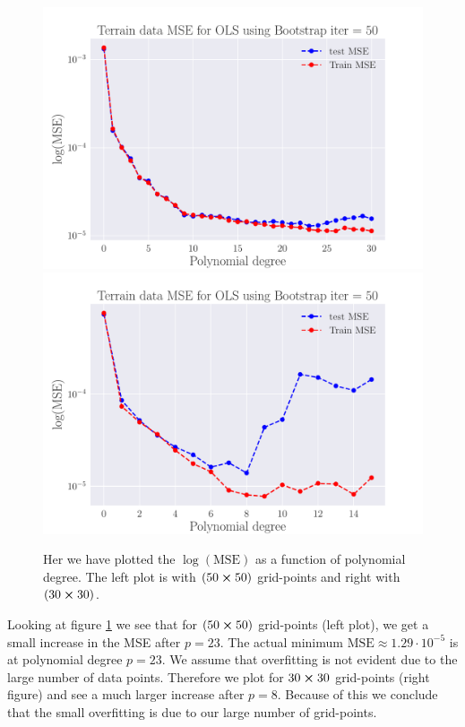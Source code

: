 \documentclass[reprint,english,notitlepage,aps,nobalancelastpage,nofootinbib]{revtex4-1}  %
\begin{document}
\begin{figure}[h]
  \includegraphics[width=\linewidth]{SRTM_MSE_OLS_n50_pol30_Bootstrap_re50_log.pdf}
  \endminipage\hfill
  \includegraphics[width=\linewidth]{SRTM_MSE_OLS_n30_pol15_Bootstrap_re50_log.pdf}
  \endminipage
  \caption{Her we have plotted the $\log(\text{MSE})$ as a function of polynomial degree. The left plot is with $(50\cross50)$ grid-points and right with $(30\cross30)$.}
  \label{fig:terrain_OLS_MSE_bootstrap}
\end{figure}
Looking at figure \ref{fig:terrain_OLS_MSE_bootstrap} we see that for $(50\cross50)$ grid-points (left plot), we get a small increase in the MSE after $p = 23$. The actual minimum $\text{MSE} \approx 1.29\cdot10^{-5}$ is at polynomial degree $p = 23$. We assume that overfitting is not evident due to the large number of data points. Therefore we plot for $30\cross30$ grid-points (right figure) and see a much larger increase after $p = 8$. Because of this we conclude that the small overfitting is due to our large number of grid-points.
\end{document}
